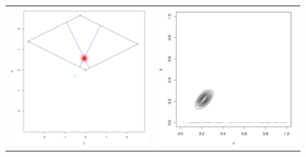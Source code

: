 \documentclass{beamer}
\begin{document}
\begin{frame}
\begin{itemize}
    \begin{figure}
  \centering
  \begin{tabular}{cc}
    \begin{minipage}{0.3\textwidth}
      \centering
      \includegraphics[width=1\linewidth]{../small-time-solution.png}
    \end{minipage}
    & \begin{minipage}{0.3\textwidth}
      \centering
      \includegraphics[width=1\linewidth]{../small-time-solution-contour.png}
    \end{minipage}
  \end{tabular}
\end{figure}
\end{itemize}
\end{frame}
\end{document}

